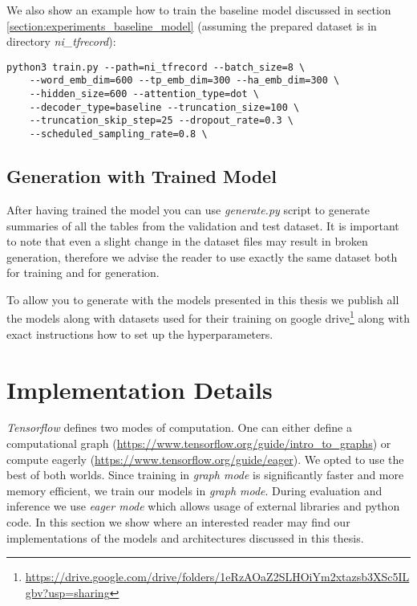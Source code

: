 We also show an example how to train the baseline model discussed in section \ref{section:experiments_baseline_model} (assuming the prepared dataset is in directory \emph{ni\_tfrecord}):

\begin{verbatim}
python3 train.py --path=ni_tfrecord --batch_size=8 \
    --word_emb_dim=600 --tp_emb_dim=300 --ha_emb_dim=300 \
    --hidden_size=600 --attention_type=dot \
    --decoder_type=baseline --truncation_size=100 \
    --truncation_skip_step=25 --dropout_rate=0.3 \
    --scheduled_sampling_rate=0.8 \
\end{verbatim}

\subsection{Generation with Trained Model}

After having trained the model you can use \emph{generate.py} script to generate summaries of all the tables from the validation and test dataset. It is important to note that even a slight change in the dataset files may result in broken generation, therefore we advise the reader to use exactly the same dataset both for training and for generation.

To allow you to generate with the models presented in this thesis we publish all the models along with datasets used for their training on google drive\footnote{\url{https://drive.google.com/drive/folders/1eRzAOaZ2SLHOiYm2xtazsb3XSc5ILgbv?usp=sharing}} along with exact instructions how to set up the hyperparameters.

\section{Implementation Details}

\emph{Tensorflow} defines two modes of computation. One can either define a computational graph (\url{https://www.tensorflow.org/guide/intro_to_graphs}) or compute eagerly (\url{https://www.tensorflow.org/guide/eager}). We opted to use the best of both worlds. Since training in \emph{graph mode} is significantly faster and more memory efficient, we train our models in \emph{graph mode}. During evaluation and inference we use \emph{eager mode} which allows usage of external libraries and python code. In this section we show where an interested reader may find our implementations of the models and architectures discussed in this thesis.

